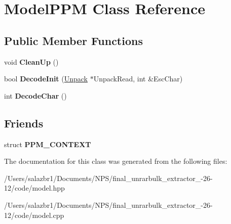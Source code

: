 \hypertarget{class_model_p_p_m}{\section{Model\-P\-P\-M Class Reference}
\label{class_model_p_p_m}
}
\subsection*{Public Member Functions}
\begin{DoxyCompactItemize}
\item 
\hypertarget{class_model_p_p_m_a73f7b37ca222c1705b21c77bc087517e}{void {\bfseries Clean\-Up} ()}\label{class_model_p_p_m_a73f7b37ca222c1705b21c77bc087517e}

\item 
\hypertarget{class_model_p_p_m_a7c1dee7a9683ad952691f97b71dda662}{bool {\bfseries Decode\-Init} (\hyperlink{class_unpack}{Unpack} $\ast$Unpack\-Read, int \&Esc\-Char)}\label{class_model_p_p_m_a7c1dee7a9683ad952691f97b71dda662}

\item 
\hypertarget{class_model_p_p_m_a87f01605ccdedca3d27b218b2a0b9e56}{int {\bfseries Decode\-Char} ()}\label{class_model_p_p_m_a87f01605ccdedca3d27b218b2a0b9e56}

\end{DoxyCompactItemize}
\subsection*{Friends}
\begin{DoxyCompactItemize}
\item 
\hypertarget{class_model_p_p_m_a66489b21d67f04d21aa22be31740a628}{struct {\bfseries P\-P\-M\-\_\-\-C\-O\-N\-T\-E\-X\-T}}\label{class_model_p_p_m_a66489b21d67f04d21aa22be31740a628}

\end{DoxyCompactItemize}


The documentation for this class was generated from the following files\-:\begin{DoxyCompactItemize}
\item 
/\-Users/salazbr1/\-Documents/\-N\-P\-S/final\-\_\-unrarbulk\-\_\-extractor\-\_-\/26-\/12/code/model.\-hpp\item 
/\-Users/salazbr1/\-Documents/\-N\-P\-S/final\-\_\-unrarbulk\-\_\-extractor\-\_-\/26-\/12/code/model.\-cpp\end{DoxyCompactItemize}
